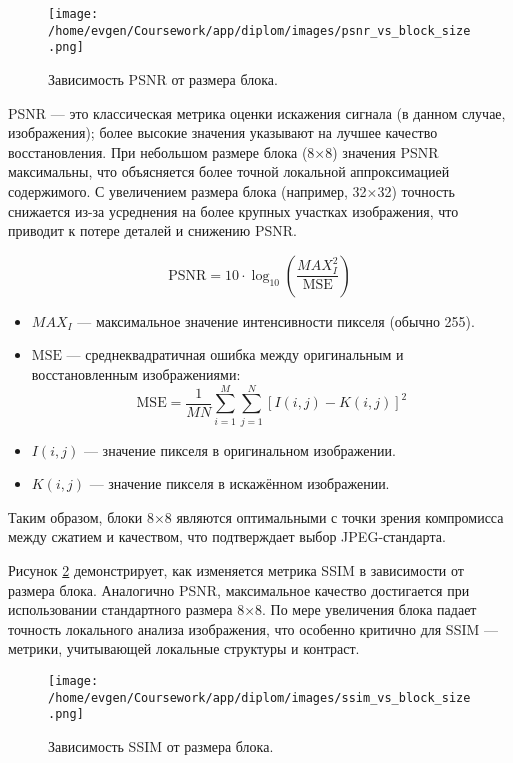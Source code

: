 \begin{figure}[H]
    \centering
    \texttt{[image: /home/evgen/Coursework/app/diplom/images/psnr\_vs\_block\_size.png]}
    \caption{Зависимость PSNR от размера блока.}
    \label{fig:psnr_vs_blocksize}
\end{figure}

PSNR — это классическая метрика оценки искажения сигнала (в данном случае, изображения); 
более высокие значения указывают на лучшее качество восстановления. При небольшом размере блока 
(8×8) значения PSNR максимальны, что объясняется более точной локальной аппроксимацией содержимого. 
С увеличением размера блока (например, 32×32) точность снижается из-за усреднения на более крупных 
участках изображения, что приводит к потере деталей и снижению PSNR.

\begin{equation}
\text{PSNR} = 10 \cdot \log_{10} \left( \frac{MAX_I^2}{\text{MSE}} \right)
\end{equation}


\begin{itemize}
    \item $MAX_I$ — максимальное значение интенсивности пикселя (обычно 255).
    \item $\text{MSE}$ — среднеквадратичная ошибка между оригинальным и восстановленным изображениями:
    \[
    \text{MSE} = \frac{1}{MN} \sum_{i=1}^{M} \sum_{j=1}^{N} \left[ I(i,j) - K(i,j) \right]^2
    \]
    \item $I(i,j)$ — значение пикселя в оригинальном изображении.
    \item $K(i,j)$ — значение пикселя в искажённом изображении.
\end{itemize}



Таким образом, блоки 8×8 являются оптимальными с точки зрения компромисса между сжатием и качеством, 
что подтверждает выбор JPEG-стандарта.

Рисунок \ref{fig:ssim_vs_blocksize} демонстрирует, как изменяется метрика SSIM в зависимости от размера блока. 
Аналогично PSNR, максимальное качество достигается при использовании стандартного размера 8×8. 
По мере увеличения блока падает точность локального анализа изображения, 
что особенно критично для SSIM — метрики, учитывающей локальные структуры и контраст.

\begin{figure}[H]
    \centering
    \texttt{[image: /home/evgen/Coursework/app/diplom/images/ssim\_vs\_block\_size.png]}
    \caption{Зависимость SSIM от размера блока.}
    \label{fig:ssim_vs_blocksize}
\end{figure}

